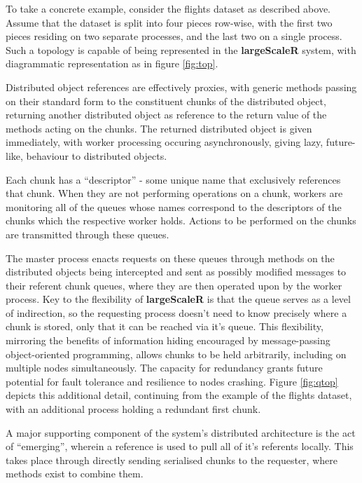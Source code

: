 To take a concrete example, consider the flights dataset as described above.
Assume that the dataset is split into four pieces row-wise, with the first two pieces residing on two separate processes, and the last two on a single process.
Such a topology is capable of being represented in the \textbf{largeScaleR} system, with diagrammatic representation as in figure \ref{fig:top}.



Distributed object references are effectively proxies, with generic methods passing on their standard form to the constituent chunks of the distributed object, returning another distributed object as reference to the return value of the methods acting on the chunks.
The returned distributed object is given immediately, with worker processing occuring asynchronously, giving lazy, future-like, behaviour to distributed objects\cite{baker1977incremental}.

Each chunk has a ``descriptor'' - some unique name that exclusively references that chunk.
When they are not performing operations on a chunk, workers are monitoring all of the queues whose names correspond to the descriptors of the chunks which the respective worker holds.
Actions to be performed on the chunks are transmitted through these queues.

The master process enacts requests on these queues through methods on the distributed objects being intercepted and sent as possibly modified messages to their referent chunk queues, where they are then operated upon by the worker process.
Key to the flexibility of \textbf{largeScaleR} is that the queue serves as a level of indirection, so the requesting process doesn't need to know precisely where a chunk is stored, only that it can be reached via it's queue.
This flexibility, mirroring the benefits of information hiding encouraged by message-passing object-oriented programming, allows chunks to be held arbitrarily, including on multiple nodes simultaneously.
The capacity for redundancy grants future potential for fault tolerance and resilience to nodes crashing.
Figure \ref{fig:qtop} depicts this additional detail, continuing from the example of the flights dataset, with an additional process holding a redundant first chunk.



A major supporting component of the system's distributed architecture is the act of ``emerging'', wherein a reference is used to pull all of it's referents locally\cite{emmerich2000engineering}.
This takes place through directly sending serialised chunks to the requester, where methods exist to combine them.\\

